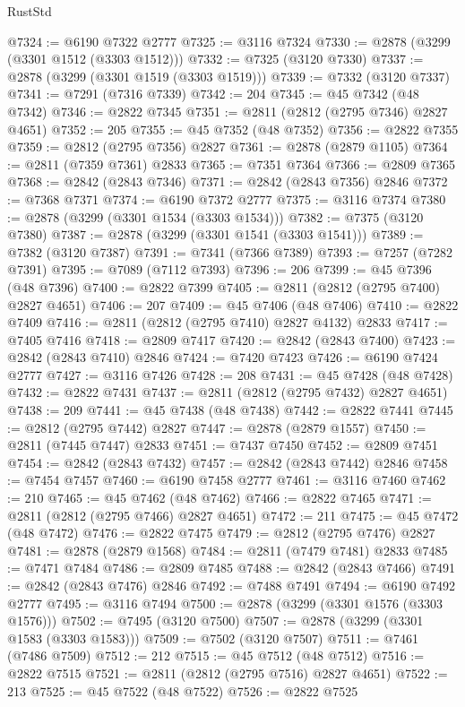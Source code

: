 \begin{lexlean}{RustStd}
\begin{coremodule}
{\begin{coremodule}
{{{{{{{{{{{{{{{{{{{{{{{{{{{{{{{{{@7324 := @6190 @7322 @2777
@7325 := @3116 @7324
@7330 := @2878 (@3299 (@3301 @1512 (@3303 @1512)))
@7332 := @7325 (@3120 @7330)
@7337 := @2878 (@3299 (@3301 @1519 (@3303 @1519)))
@7339 := @7332 (@3120 @7337)
@7341 := @7291 (@7316 @7339)
@7342 := 204
@7345 := @45 @7342 (@48 @7342)
@7346 := @2822 @7345
@7351 := @2811 (@2812 (@2795 @7346) @2827 @4651)
@7352 := 205
@7355 := @45 @7352 (@48 @7352)
@7356 := @2822 @7355
@7359 := @2812 (@2795 @7356) @2827
@7361 := @2878 (@2879 @1105)
@7364 := @2811 (@7359 @7361) @2833
@7365 := @7351 @7364
@7366 := @2809 @7365
@7368 := @2842 (@2843 @7346)
@7371 := @2842 (@2843 @7356) @2846
@7372 := @7368 @7371
@7374 := @6190 @7372 @2777
@7375 := @3116 @7374
@7380 := @2878 (@3299 (@3301 @1534 (@3303 @1534)))
@7382 := @7375 (@3120 @7380)
@7387 := @2878 (@3299 (@3301 @1541 (@3303 @1541)))
@7389 := @7382 (@3120 @7387)
@7391 := @7341 (@7366 @7389)
@7393 := @7257 (@7282 @7391)
@7395 := @7089 (@7112 @7393)
@7396 := 206
@7399 := @45 @7396 (@48 @7396)
@7400 := @2822 @7399
@7405 := @2811 (@2812 (@2795 @7400) @2827 @4651)
@7406 := 207
@7409 := @45 @7406 (@48 @7406)
@7410 := @2822 @7409
@7416 := @2811 (@2812 (@2795 @7410) @2827 @4132) @2833
@7417 := @7405 @7416
@7418 := @2809 @7417
@7420 := @2842 (@2843 @7400)
@7423 := @2842 (@2843 @7410) @2846
@7424 := @7420 @7423
@7426 := @6190 @7424 @2777
@7427 := @3116 @7426
@7428 := 208
@7431 := @45 @7428 (@48 @7428)
@7432 := @2822 @7431
@7437 := @2811 (@2812 (@2795 @7432) @2827 @4651)
@7438 := 209
@7441 := @45 @7438 (@48 @7438)
@7442 := @2822 @7441
@7445 := @2812 (@2795 @7442) @2827
@7447 := @2878 (@2879 @1557)
@7450 := @2811 (@7445 @7447) @2833
@7451 := @7437 @7450
@7452 := @2809 @7451
@7454 := @2842 (@2843 @7432)
@7457 := @2842 (@2843 @7442) @2846
@7458 := @7454 @7457
@7460 := @6190 @7458 @2777
@7461 := @3116 @7460
@7462 := 210
@7465 := @45 @7462 (@48 @7462)
@7466 := @2822 @7465
@7471 := @2811 (@2812 (@2795 @7466) @2827 @4651)
@7472 := 211
@7475 := @45 @7472 (@48 @7472)
@7476 := @2822 @7475
@7479 := @2812 (@2795 @7476) @2827
@7481 := @2878 (@2879 @1568)
@7484 := @2811 (@7479 @7481) @2833
@7485 := @7471 @7484
@7486 := @2809 @7485
@7488 := @2842 (@2843 @7466)
@7491 := @2842 (@2843 @7476) @2846
@7492 := @7488 @7491
@7494 := @6190 @7492 @2777
@7495 := @3116 @7494
@7500 := @2878 (@3299 (@3301 @1576 (@3303 @1576)))
@7502 := @7495 (@3120 @7500)
@7507 := @2878 (@3299 (@3301 @1583 (@3303 @1583)))
@7509 := @7502 (@3120 @7507)
@7511 := @7461 (@7486 @7509)
@7512 := 212
@7515 := @45 @7512 (@48 @7512)
@7516 := @2822 @7515
@7521 := @2811 (@2812 (@2795 @7516) @2827 @4651)
@7522 := 213
@7525 := @45 @7522 (@48 @7522)
@7526 := @2822 @7525
}}}}}}}}}}}}}}}}}}}}}}}}}}}}}}}}}
\end{coremodule}}
\end{coremodule}
\end{lexlean}
